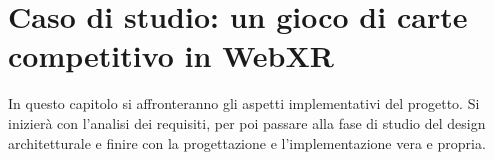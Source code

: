 \chapter{Caso di studio: un gioco di carte competitivo in WebXR}\label{chap:Sviluppo}
In questo capitolo si affronteranno gli aspetti implementativi del progetto. Si inizierà con l'analisi dei requisiti, per poi passare alla fase di studio del design architetturale e
finire con la progettazione e l'implementazione vera e propria.






